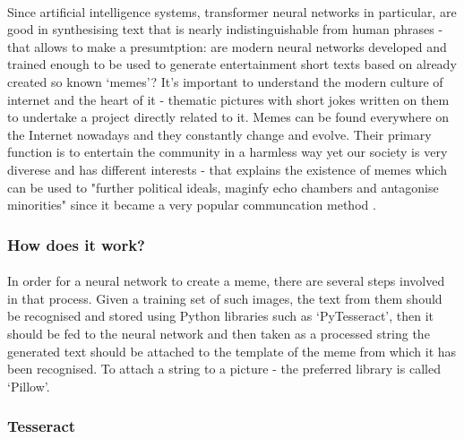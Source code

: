 \documentclass[12pt]{report}
\begin{document}
    \paragraph{}

    Since artificial intelligence systems, transformer neural networks in particular, are good in synthesising text that is nearly indistinguishable from human phrases - that allows to make a presumtption: are modern neural networks developed and trained enough to be used to generate
    entertainment short texts based on already created so known `memes'? It's important to understand the modern culture of internet and the heart of it - thematic pictures with short jokes written on them to undertake a project directly related to it.
    Memes can be found everywhere on the Internet nowadays and they constantly change and evolve. Their primary function is to entertain the community in a harmless way yet our society is very diverese and has different interests - that explains the existence of memes which can be used
    to "further political ideals, maginfy echo chambers and antagonise minorities" since it became a very popular communcation method \citep{dank_learning}. 

    \subsubsection{How does it work?}
    \paragraph{}

    In order for a neural network to create a meme, there are several steps involved in that process. Given a training set of such images, the text from them should be recognised and stored using Python libraries such as `PyTesseract', then it should be fed to the neural network and then taken as a processed string
    the generated text should be attached to the template of the meme from which it has been recognised. To attach a string to a picture - the preferred library is called `Pillow'.

    \subsubsection{Tesseract}
    \paragraph{}
\end{document}
